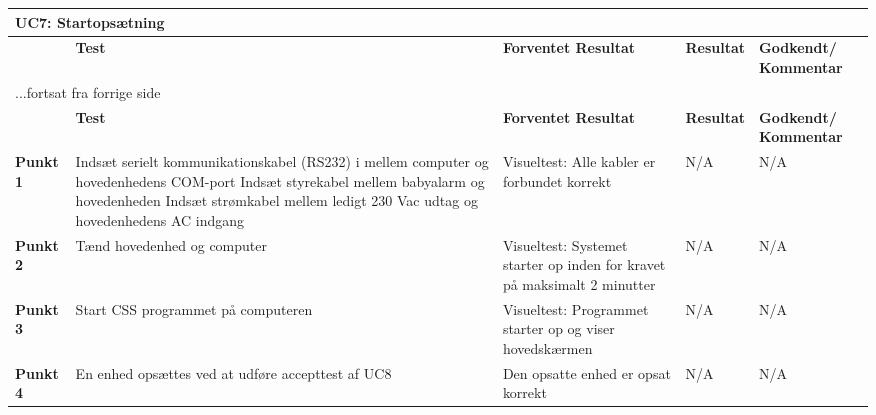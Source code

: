 
\begin{center}
\begin{longtable}{|p{}|p{}|p{3cm}|p{3cm}|p{3cm}|} %
\hline
\multicolumn{5}{|l|}{\textbf{UC7: Startopsætning}} \\ \hline
\multicolumn{1}{|c|}{} &
\textbf{Test} &
\textbf{Forventet \newline Resultat} &
\textbf{Resultat} &
\textbf{Godkendt/ \newline Kommentar} \\ \hline 
\endfirsthead

\multicolumn{5}{l}{...fortsat fra forrige side} \\ \hline 
\multicolumn{1}{|c|}{} &
\textbf{Test} &
\textbf{Forventet \newline Resultat} &
\textbf{Resultat} &
\textbf{Godkendt/ \newline Kommentar} \\ \hline 
\endhead


\textbf{Punkt 1} &
Indsæt serielt kommunikationskabel (RS232) i mellem computer og hovedenhedens COM-port\newline
Indsæt styrekabel mellem babyalarm og hovedenheden\newline
Indsæt strømkabel mellem ledigt 230 Vac udtag og hovedenhedens AC indgang &
Visueltest: Alle kabler er forbundet korrekt &
N/A &
N/A \\\hline

\textbf{Punkt 2} &
Tænd hovedenhed og computer &
Visueltest: Systemet starter op inden for kravet på maksimalt 2 minutter &
N/A &
N/A \\\hline

\textbf{Punkt 3} &
Start CSS programmet på computeren &
Visueltest: Programmet starter op og viser hovedskærmen &
N/A &
N/A \\\hline

\textbf{Punkt 4} &
En enhed opsættes ved at udføre accepttest af UC8 &
Den opsatte enhed er opsat korrekt &
N/A &
N/A \\\hline

	\end{longtable}
	\label{ATUC7} 
\end{center}